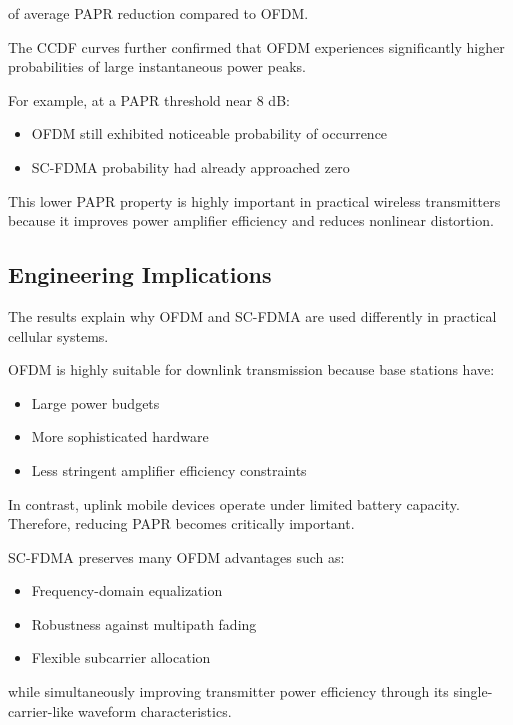 of average PAPR reduction compared to OFDM.

The CCDF curves further confirmed that OFDM experiences significantly
higher probabilities of large instantaneous power peaks.

For example, at a PAPR threshold near 8 dB:

\begin{itemize}
    \item OFDM still exhibited noticeable probability of occurrence
    \item SC-FDMA probability had already approached zero
\end{itemize}

This lower PAPR property is highly important in practical wireless
transmitters because it improves power amplifier efficiency and reduces
nonlinear distortion.

\subsection{Engineering Implications}

The results explain why OFDM and SC-FDMA are used differently in practical
cellular systems.

OFDM is highly suitable for downlink transmission because base stations
have:

\begin{itemize}
    \item Large power budgets
    \item More sophisticated hardware
    \item Less stringent amplifier efficiency constraints
\end{itemize}

In contrast, uplink mobile devices operate under limited battery capacity.
Therefore, reducing PAPR becomes critically important.

SC-FDMA preserves many OFDM advantages such as:

\begin{itemize}
    \item Frequency-domain equalization
    \item Robustness against multipath fading
    \item Flexible subcarrier allocation
\end{itemize}

while simultaneously improving transmitter power efficiency through its
single-carrier-like waveform characteristics.


